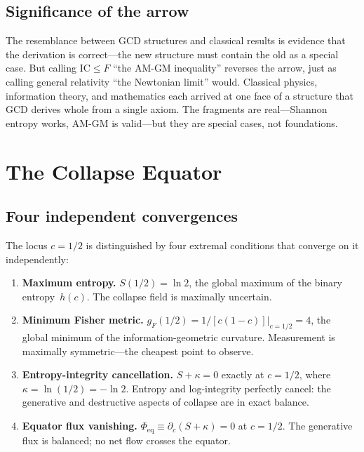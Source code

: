 \documentclass[
  aps,
  prd,
  twocolumn,
  superscriptaddress,
  nofootinbib,
  floatfix
]{revtex4-2}
\newcommand{\IC}{\mathrm{IC}}
\newcommand{\gF}{g_{\!F}}
\begin{document}
\subsection{Significance of the arrow}

The resemblance between GCD structures and classical results is
evidence that the derivation is correct---the new structure must
contain the old as a special case.  But calling $\IC \leq F$ ``the
AM-GM inequality'' reverses the arrow, just as calling general
relativity ``the Newtonian limit'' would.  Classical physics,
information theory, and mathematics each arrived at one face of a
structure that GCD derives whole from a single axiom.  The fragments
are real---Shannon entropy works, AM-GM is valid---but they are
special cases, not foundations.

\section{The Collapse Equator}\label{sec:equator}

\subsection{Four independent convergences}

The locus $c = 1/2$ is distinguished by four extremal conditions that
converge on it independently:

\begin{enumerate}[leftmargin=*,label=(\roman*)]
\item \textbf{Maximum entropy.}  $S(1/2) = \ln 2$, the global
  maximum of the binary entropy~$h(c)$.  The collapse field is
  maximally uncertain.

\item \textbf{Minimum Fisher metric.}
  $\gF(1/2) = 1/[c(1{-}c)]|_{c=1/2} = 4$, the global minimum
  of the information-geometric curvature.  Measurement is maximally
  symmetric---the cheapest point to observe.

\item \textbf{Entropy-integrity cancellation.}  $S + \kappa = 0$
  exactly at $c = 1/2$, where $\kappa = \ln(1/2) = -\ln 2$.
  Entropy and log-integrity perfectly cancel: the generative and
  destructive aspects of collapse are in exact balance.

\item \textbf{Equator flux vanishing.}
  $\Phi_{\mathrm{eq}} \equiv \partial_c(S + \kappa) = 0$ at
  $c = 1/2$.  The generative flux is balanced; no net flow crosses
  the equator.
\end{enumerate}
\end{document}
